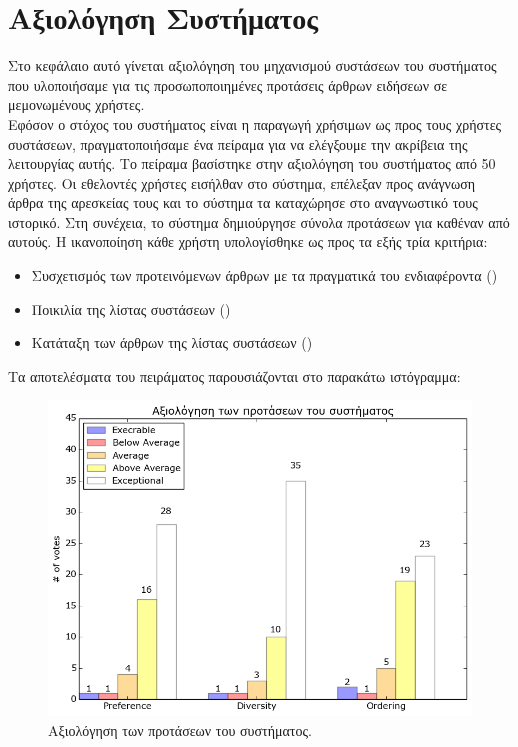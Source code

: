 \chapter{Αξιολόγηση Συστήματος}
Στο κεφάλαιο αυτό γίνεται αξιολόγηση του μηχανισμού συστάσεων του συστήματος που υλοποιήσαμε 
για τις προσωποποιημένες προτάσεις άρθρων ειδήσεων σε μεμονωμένους χρήστες. \\

Εφόσον ο στόχος του συστήματος είναι η παραγωγή χρήσιμων ως προς τους χρήστες συστάσεων, 
πραγματοποιήσαμε ένα πείραμα για να ελέγξουμε την ακρίβεια της λειτουργίας αυτής. 
Το πείραμα βασίστηκε στην αξιολόγηση του συστήματος από 50 χρήστες.
Οι εθελοντές χρήστες εισήλθαν στο σύστημα, επέλεξαν προς ανάγνωση άρθρα της αρεσκείας τους 
και το σύστημα τα καταχώρησε στο αναγνωστικό τους ιστορικό. 
Στη συνέχεια, το σύστημα δημιούργησε σύνολα προτάσεων για καθέναν από αυτούς. 
Η ικανοποίηση κάθε χρήστη υπολογίσθηκε ως προς τα εξής τρία κριτήρια: 
\begin{itemize}
  \item Συσχετισμός των προτεινόμενων άρθρων με τα πραγματικά του ενδιαφέροντα ({})
  \item Ποικιλία της λίστας συστάσεων ({})
  \item Kατάταξη των άρθρων της λίστας συστάσεων ({})
\end{itemize}

\newpage

Τα αποτελέσματα του πειράματος παρουσιάζονται στο παρακάτω ιστόγραμμα: \\

\begin{figure}[!ht] \centering
\centerline{
    \includegraphics[scale=0.7]{static/figures/plots/plot1.png}}
    \caption{Αξιολόγηση των προτάσεων του συστήματος.}
    \label{}
\end{figure} 

